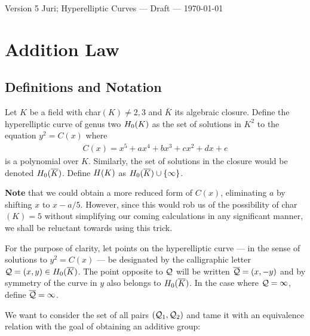 \documentclass[english,11pt,a4paper]{article}
\begin{document}

Version 5 \scriptsize \hfill Juri; Hyperelliptic Curves --- Draft --- \today
\normalsize

\section{Addition Law}

\subsection{Definitions and Notation}

\begin{defin}
  Let $K$ be a field with char$(K) \neq 2, 3$ and $\bar K$ its algebraic closure. Define the hyperelliptic curve of genus two $H_0(K)$ as the set of solutions in $K^2$ to the equation $y^2=C(x)$ where
  \begin{align*}
    C(x)=x^5+ax^4+bx^3+cx^2+dx+e
  \end{align*}
  is a polynomial over $K$. Similarly, the set of solutions in the closure would be denoted $H_0(\overline K)$.  Define $H(K)$ as $H_0(\overline K) \cup \{ \infty \}$.


  \textbf{Note} that we could obtain a more reduced form of $C(x)$, eliminating $a$ by shifting $x$ to $x-a/5$. However, since this would rob us of the possibility of char$(K) = 5$ without simplifying our coming calculations in any significant manner, we shall be reluctant towards using this trick.

  For the purpose of clarity, let points on the hyperelliptic curve --- in the sense of solutions to $y^2=C(x)$ --- be designated by the calligraphic letter $\mathcal{Q}=(x,y) \in H_0(\overline K)$. The point opposite to $\mathcal{Q}$ will be written $\overline {\mathcal{Q}} = (x,-y)$ and by symmetry of the curve in $y$ also belongs to $H_0(\overline K)$. In the case where $\mathcal{Q} = \infty$, define $\overline {\mathcal{Q}} = \infty$.

  We want to consider the set of all pairs $(\mathcal{Q}_1,\mathcal{Q}_2)$ and tame it with an equivalence relation with the goal of obtaining an additive group:
\end{defin}
\end{document}
